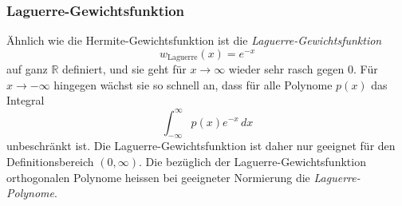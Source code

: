 %
%
\subsubsection{Laguerre-Gewichtsfunktion}
Ähnlich wie die Hermite-Gewichtsfunktion ist die
{\em Laguerre-Gewichtsfunktion}
%
\[
w_{\text{Laguerre}}(x)
=
e^{-x}
\]
%
auf ganz $\mathbb{R}$ definiert, und sie geht für $x\to\infty$ wieder
sehr rasch gegen $0$.
Für $x\to-\infty$ hingegen wächst sie so schnell an, dass für alle Polynome
$p(x)$ das Integral
\[
\int_{-\infty}^\infty p(x)e^{-x}\,dx
\]
unbeschränkt ist.
Die Laguerre-Gewichtsfunktion ist daher nur geeignet für den
Definitionsbereich $(0,\infty)$.
Die bezüglich der Laguerre-Gewichtsfunktion orthogonalen Polynome
heissen bei geeigneter Normierung die {\em Laguerre-Polynome}.
%
